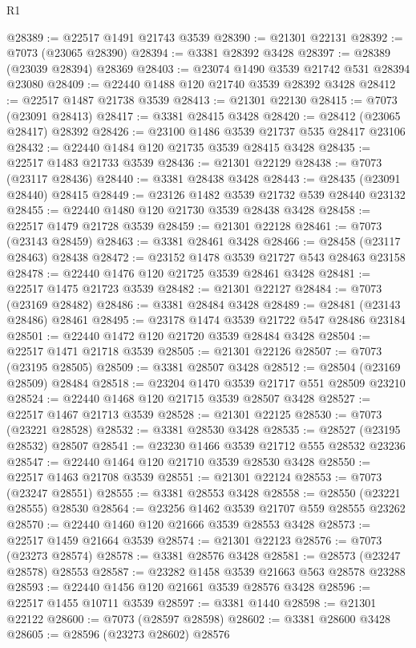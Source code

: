 \begin{lexlean}{R1}
\begin{coremodule}
@28389 := @22517 @1491 @21743 @3539
@28390 := @21301 @22131
@28392 := @7073 (@23065 @28390)
@28394 := @3381 @28392 @3428
@28397 := @28389 (@23039 @28394) @28369
@28403 := @23074 @1490 @3539 @21742 @531 @28394 @23080
@28409 := @22440 @1488 @120 @21740 @3539 @28392 @3428
@28412 := @22517 @1487 @21738 @3539
@28413 := @21301 @22130
@28415 := @7073 (@23091 @28413)
@28417 := @3381 @28415 @3428
@28420 := @28412 (@23065 @28417) @28392
@28426 := @23100 @1486 @3539 @21737 @535 @28417 @23106
@28432 := @22440 @1484 @120 @21735 @3539 @28415 @3428
@28435 := @22517 @1483 @21733 @3539
@28436 := @21301 @22129
@28438 := @7073 (@23117 @28436)
@28440 := @3381 @28438 @3428
@28443 := @28435 (@23091 @28440) @28415
@28449 := @23126 @1482 @3539 @21732 @539 @28440 @23132
@28455 := @22440 @1480 @120 @21730 @3539 @28438 @3428
@28458 := @22517 @1479 @21728 @3539
@28459 := @21301 @22128
@28461 := @7073 (@23143 @28459)
@28463 := @3381 @28461 @3428
@28466 := @28458 (@23117 @28463) @28438
@28472 := @23152 @1478 @3539 @21727 @543 @28463 @23158
@28478 := @22440 @1476 @120 @21725 @3539 @28461 @3428
@28481 := @22517 @1475 @21723 @3539
@28482 := @21301 @22127
@28484 := @7073 (@23169 @28482)
@28486 := @3381 @28484 @3428
@28489 := @28481 (@23143 @28486) @28461
@28495 := @23178 @1474 @3539 @21722 @547 @28486 @23184
@28501 := @22440 @1472 @120 @21720 @3539 @28484 @3428
@28504 := @22517 @1471 @21718 @3539
@28505 := @21301 @22126
@28507 := @7073 (@23195 @28505)
@28509 := @3381 @28507 @3428
@28512 := @28504 (@23169 @28509) @28484
@28518 := @23204 @1470 @3539 @21717 @551 @28509 @23210
@28524 := @22440 @1468 @120 @21715 @3539 @28507 @3428
@28527 := @22517 @1467 @21713 @3539
@28528 := @21301 @22125
@28530 := @7073 (@23221 @28528)
@28532 := @3381 @28530 @3428
@28535 := @28527 (@23195 @28532) @28507
@28541 := @23230 @1466 @3539 @21712 @555 @28532 @23236
@28547 := @22440 @1464 @120 @21710 @3539 @28530 @3428
@28550 := @22517 @1463 @21708 @3539
@28551 := @21301 @22124
@28553 := @7073 (@23247 @28551)
@28555 := @3381 @28553 @3428
@28558 := @28550 (@23221 @28555) @28530
@28564 := @23256 @1462 @3539 @21707 @559 @28555 @23262
@28570 := @22440 @1460 @120 @21666 @3539 @28553 @3428
@28573 := @22517 @1459 @21664 @3539
@28574 := @21301 @22123
@28576 := @7073 (@23273 @28574)
@28578 := @3381 @28576 @3428
@28581 := @28573 (@23247 @28578) @28553
@28587 := @23282 @1458 @3539 @21663 @563 @28578 @23288
@28593 := @22440 @1456 @120 @21661 @3539 @28576 @3428
@28596 := @22517 @1455 @10711 @3539
@28597 := @3381 @1440
@28598 := @21301 @22122
@28600 := @7073 (@28597 @28598)
@28602 := @3381 @28600 @3428
@28605 := @28596 (@23273 @28602) @28576

\end{coremodule}
\end{lexlean}
